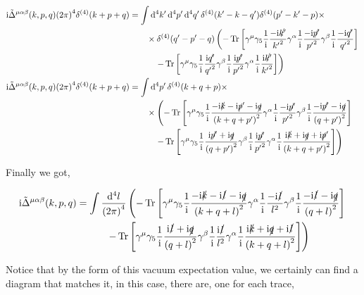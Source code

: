 \begin{align}
    \textnormal{i}{\tilde\Delta}^{\mu\alpha\beta}\qty(k,p,q)\qty(2\pi)^4\delta^{\qty(4)}\qty(k+p+q)&=
    \int\dd[4]{k'}\dd[4]{p'}\dd[4]{q'}\delta^{\qty(4)}\qty(k'-k-q')\delta^{\qty(4)}\qty(p'-k'-p)\times\nonumber\\
    &\quad\quad\times\delta^{\qty(4)}\qty(q'-p'-q)\left(-\Tr\qty[\gamma^\mu\gamma_5\frac1{\textnormal{i}} \frac{-\textnormal{i}\slashed {k'}}{{k'}^2}\gamma^\alpha\frac1{\textnormal{i}} \frac{-\textnormal{i}\slashed {p'}}{{p'}^2}\gamma^\beta\frac1{\textnormal{i}} \frac{-\textnormal{i}\slashed {q'}}{{q'}^2}]\right.\nonumber\\
    &\quad\quad\quad\left.-\Tr\qty[\gamma^\mu\gamma_5\frac1{\textnormal{i}} \frac{\textnormal{i}\slashed {q'}}{{q'}^2}\gamma^\beta\frac1{\textnormal{i}}\frac{\textnormal{i}\slashed {p'}}{{p'}^2}\gamma^\alpha\frac1{\textnormal{i}} \frac{\textnormal{i}\slashed {k'}}{{k'}^2}]\right)\nonumber\\
    \textnormal{i}{\tilde\Delta}^{\mu\alpha\beta}\qty(k,p,q)\qty(2\pi)^4\delta^{\qty(4)}\qty(k+p+q)&=
    \int\dd[4]{p'}\delta^{\qty(4)}\qty(k+q+p)\times\nonumber\\
    &\quad\quad\times\left(-\Tr\qty[\gamma^\mu\gamma_5\frac1{\textnormal{i}} \frac{-\textnormal{i}\slashed {k}-\textnormal{i} \slashed{p}'-\textnormal{i}\slashed q}{\qty(k+q+p')^2}\gamma^\alpha\frac1{\textnormal{i}} \frac{-\textnormal{i}\slashed {p'}}{{p'}^2}\gamma^\beta\frac1{\textnormal{i}} \frac{-\textnormal{i}\slashed {p'}-\textnormal{i}\slashed q}{\qty(q+p')^2}]\right.\nonumber\\
    &\quad\quad\quad\left.-\Tr\qty[\gamma^\mu\gamma_5\frac1{\textnormal{i}} \frac{\textnormal{i}\slashed {p'}+\textnormal{i}\slashed q}{\qty(q+p')^2}\gamma^\beta\frac1{\textnormal{i}}\frac{\textnormal{i}\slashed {p'}}{{p'}^2}\gamma^\alpha\frac1{\textnormal{i}} \frac{\textnormal{i}\slashed {k}+\textnormal{i}\slashed{q}+\textnormal{i}\slashed p'}{\qty(k+q+p')^2}]\right)\nonumber
\end{align}

Finally we got,

\begin{align}
    \textnormal{i}{\tilde\Delta}^{\mu\alpha\beta}\qty(k,p,q)&=
    \int\frac{\dd[4]{l}}{\qty(2\pi)^4}\left(-\Tr\qty[\gamma^\mu\gamma_5\frac1{\textnormal{i}} \frac{-\textnormal{i}\slashed {k}-\textnormal{i} \slashed{l}-\textnormal{i}\slashed q}{\qty(k+q+l)^2}\gamma^\alpha\frac1{\textnormal{i}} \frac{-\textnormal{i}\slashed {l}}{{l}^2}\gamma^\beta\frac1{\textnormal{i}} \frac{-\textnormal{i}\slashed {l}-\textnormal{i}\slashed q}{\qty(q+l)^2}]\right.\nonumber\\
    &\quad\quad\quad\left.-\Tr\qty[\gamma^\mu\gamma_5\frac1{\textnormal{i}} \frac{\textnormal{i}\slashed {l}+\textnormal{i}\slashed q}{\qty(q+l)^2}\gamma^\beta\frac1{\textnormal{i}}\frac{\textnormal{i}\slashed {l}}{{l}^2}\gamma^\alpha\frac1{\textnormal{i}} \frac{\textnormal{i}\slashed {k}+\textnormal{i}\slashed{q}+\textnormal{i}\slashed l}{\qty(k+q+l)^2}]\right)\nonumber
\end{align}

Notice that by the form of this vacuum expectation value, we certainly can find a diagram that matches it, in this 
case, there are, one for each trace, 

